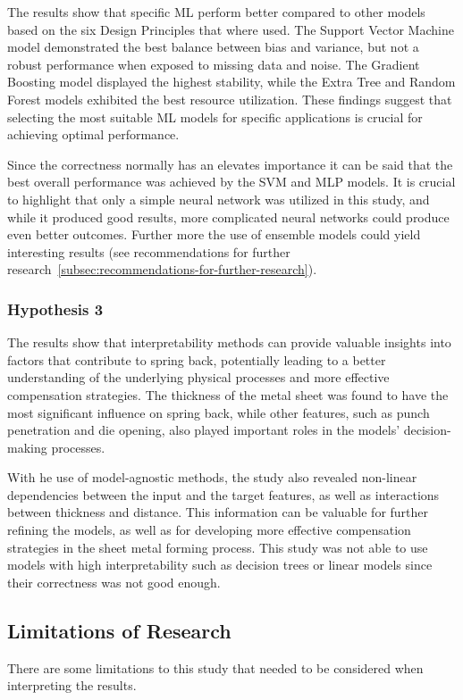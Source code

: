 The results show that specific \ac{ML} perform better compared to other models based on the six Design Principles
that where used.
The Support Vector Machine model demonstrated the best balance between bias and variance, but not a robust performance
when exposed to missing data and noise.
The Gradient Boosting model displayed the highest stability, while the Extra Tree and Random Forest models exhibited
the best resource utilization.
These findings suggest that selecting the most suitable ML models for specific applications is crucial for achieving
optimal performance.

Since the correctness normally has an elevates importance it can be said that the best overall performance was achieved
by the \ac{SVM} and \ac{MLP} models.
It is crucial to highlight that only a simple neural network was utilized in this study, and while it produced good
results, more complicated neural networks could produce even better outcomes.
Further more the use of ensemble models could yield interesting results (see recommendations for further
research~\ref{subsec:recommendations-for-further-research}).

\subsubsection{Hypothesis 3}
The results show that interpretability methods can provide valuable insights into factors that contribute to spring
back,
potentially leading to a better understanding of the underlying physical processes and more effective compensation
strategies.
The thickness of the metal sheet was found to have the most significant influence on spring back, while other
features, such as punch penetration and die opening, also played important roles in the models' decision-making
processes.

With he use of model-agnostic methods, the study also revealed non-linear dependencies between the input and the
target features, as well as interactions between thickness and distance.
This information can be valuable for further refining the models, as well as for developing more effective
compensation strategies in the sheet metal forming process.
This study was not able to use models with high interpretability such as decision trees or linear models
since their correctness was not good enough.

\subsection{Limitations of Research}\label{subsec:limitations-of-research}
There are some limitations to this study that needed to be considered when interpreting the results.

